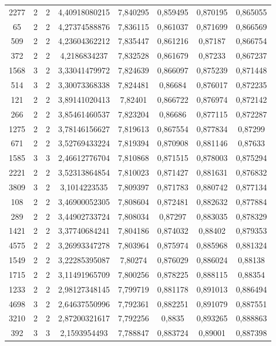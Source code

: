 \begin{longtable}{|c|c|c|c|c|c|c|c|}
2277 & 2 & 2 & 4,40918080215 & 7,840295 & 0,859495 & 0,870195 & 0,865055 \\
65 & 2 & 2 & 4,27374588876 & 7,836115 & 0,861037 & 0,871699 & 0,866569 \\
509 & 2 & 2 & 4,23604362212 & 7,835447 & 0,861216 & 0,87187 & 0,866754 \\
372 & 2 & 2 & 4,2186834237 & 7,832528 & 0,861679 & 0,87233 & 0,867237 \\
1568 & 3 & 2 & 3,33041479972 & 7,824639 & 0,866097 & 0,875239 & 0,871448 \\
514 & 3 & 2 & 3,30073368338 & 7,824481 & 0,86684 & 0,876017 & 0,872235 \\
121 & 2 & 2 & 3,89141020413 & 7,82401 & 0,866722 & 0,876974 & 0,872142 \\
266 & 2 & 2 & 3,85461460537 & 7,823204 & 0,86686 & 0,877115 & 0,872287 \\
1275 & 2 & 2 & 3,78146156627 & 7,819613 & 0,867554 & 0,877834 & 0,87299 \\
671 & 2 & 2 & 3,52769433224 & 7,819394 & 0,870908 & 0,881146 & 0,87633 \\
1585 & 3 & 3 & 2,46612776704 & 7,810868 & 0,871515 & 0,878003 & 0,875294 \\
2221 & 2 & 2 & 3,52313864854 & 7,810023 & 0,871427 & 0,881631 & 0,876832 \\
3809 & 3 & 2 & 3,1014223535 & 7,809397 & 0,871783 & 0,880742 & 0,877134 \\
108 & 2 & 2 & 3,46900052305 & 7,808604 & 0,872481 & 0,882632 & 0,877884 \\
289 & 2 & 2 & 3,44902733724 & 7,808034 & 0,87297 & 0,883035 & 0,878329 \\
1421 & 2 & 2 & 3,37740684241 & 7,804186 & 0,874032 & 0,88402 & 0,879353 \\
4575 & 2 & 2 & 3,26993347278 & 7,803964 & 0,875974 & 0,885968 & 0,881324 \\
1549 & 2 & 2 & 3,22285395087 & 7,80274 & 0,876029 & 0,886024 & 0,88138 \\
1715 & 2 & 2 & 3,11491965709 & 7,800256 & 0,878225 & 0,888115 & 0,88354 \\
1233 & 2 & 2 & 2,98127348145 & 7,799719 & 0,881178 & 0,891013 & 0,886494 \\
4698 & 3 & 2 & 2,64637550996 & 7,792361 & 0,882251 & 0,891079 & 0,887551 \\
3210 & 2 & 2 & 2,87200321617 & 7,792256 & 0,8835 & 0,893265 & 0,888863 \\
392 & 3 & 3 & 2,1593954493 & 7,788847 & 0,883724 & 0,89001 & 0,887398 \\

\end{longtable}
